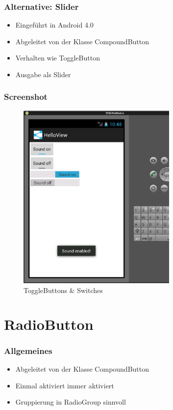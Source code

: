 \begin{frame}
   \frametitle{Alternative: Slider}
   \begin{itemize}
      \item Eingeführt in Android 4.0
      \item Abgeleitet von der Klasse CompoundButton
      \item Verhalten wie ToggleButton
      \item Ausgabe als Slider
   \end{itemize}

	
\end{frame}

\begin{frame}
   \frametitle{Screenshot}
	\begin{figure}[h!]
	  \centering
	  \includegraphics[width=0.7\textwidth]{pictures/toggle_switches.ps}
	  \caption{
		  ToggleButtons \& Switches
	  }
	  \label{fig:toggle_switches}
	\end{figure}
\end{frame}

\section{RadioButton}
\begin{frame}
   \frametitle{Allgemeines}
   \begin{itemize}
      \item Abgeleitet von der Klasse CompoundButton
      \item Einmal aktiviert immer aktiviert
      \item Gruppierung in RadioGroup sinnvoll
   \end{itemize}

	
\end{frame}

